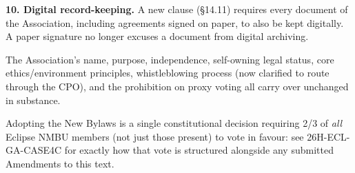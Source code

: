 \documentclass{../../../Common/Latex/Templates/rapport}
\begin{document}
\textbf{10. Digital record-keeping.} A new clause (\S14.11) requires every document of the Association, including agreements signed on paper, to also be kept digitally. A paper signature no longer excuses a document from digital archiving.

The Association's name, purpose, independence, self-owning legal status, core ethics/environment principles, whistleblowing process (now clarified to route through the CPO), and the prohibition on proxy voting all carry over unchanged in substance.

Adopting the New Bylaws is a single constitutional decision requiring 2/3 of \emph{all} Eclipse NMBU members (not just those present) to vote in favour: see 26H-ECL-GA-CASE4C for exactly how that vote is structured alongside any submitted Amendments to this text.
\end{document}
